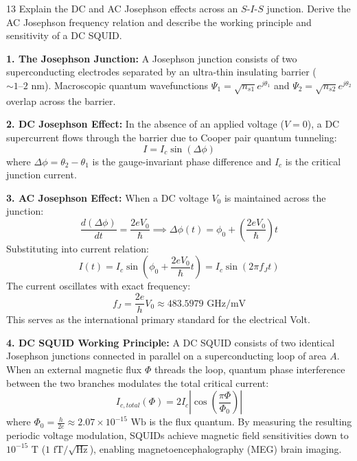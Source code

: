 \begin{theoryq}{13}
Explain the DC and AC Josephson effects across an $S$-$I$-$S$ junction. Derive the AC Josephson frequency relation and describe the working principle and sensitivity of a DC SQUID.
\end{theoryq}
\begin{theorysol}
\textbf{1. The Josephson Junction:}
A Josephson junction consists of two superconducting electrodes separated by an ultra-thin insulating barrier ($\sim 1\text{--}2\text{ nm}$). Macroscopic quantum wavefunctions $\Psi_1 = \sqrt{n_{s1}}e^{j\theta_1}$ and $\Psi_2 = \sqrt{n_{s2}}e^{j\theta_2}$ overlap across the barrier.

\textbf{2. DC Josephson Effect:}
In the absence of an applied voltage ($V=0$), a DC supercurrent flows through the barrier due to Cooper pair quantum tunneling:
\begin{equation}
I = I_c \sin(\Delta\phi)
\end{equation}
where $\Delta\phi = \theta_2 - \theta_1$ is the gauge-invariant phase difference and $I_c$ is the critical junction current.

\textbf{3. AC Josephson Effect:}
When a DC voltage $V_0$ is maintained across the junction:
\begin{equation}
\frac{d(\Delta\phi)}{dt} = \frac{2e V_0}{\hbar} \implies \Delta\phi(t) = \phi_0 + \left(\frac{2e V_0}{\hbar}\right) t
\end{equation}
Substituting into current relation:
\begin{equation}
I(t) = I_c \sin\left(\phi_0 + \frac{2e V_0}{\hbar}t\right) = I_c \sin(2\pi f_J t)
\end{equation}
The current oscillates with exact frequency:
\begin{equation}
f_J = \frac{2e}{h} V_0 \approx 483.5979\text{ GHz/mV}
\end{equation}
This serves as the international primary standard for the electrical Volt.

\textbf{4. DC SQUID Working Principle:}
A DC SQUID consists of two identical Josephson junctions connected in parallel on a superconducting loop of area $A$.
When an external magnetic flux $\Phi$ threads the loop, quantum phase interference between the two branches modulates the total critical current:
\begin{equation}
I_{c,total}(\Phi) = 2 I_c \left|\cos\left(\frac{\pi \Phi}{\Phi_0}\right)\right|
\end{equation}
where $\Phi_0 = \frac{h}{2e} \approx 2.07 \times 10^{-15}\text{ Wb}$ is the flux quantum.
By measuring the resulting periodic voltage modulation, SQUIDs achieve magnetic field sensitivities down to $10^{-15}\text{ T}$ ($1\text{ fT}/\sqrt{\text{Hz}}$), enabling magnetoencephalography (MEG) brain imaging.
\end{theorysol}
\vspace{4mm}

